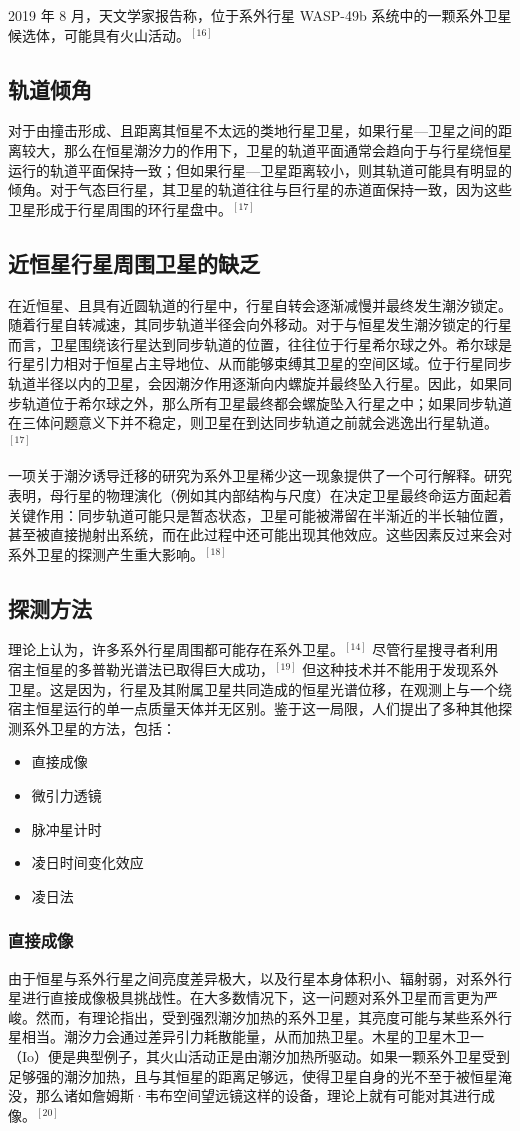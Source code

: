 2019 年 8 月，天文学家报告称，位于系外行星 WASP-49b 系统中的一颗系外卫星候选体，可能具有火山活动。$^{[16]}$
\subsection{轨道倾角}
对于由撞击形成、且距离其恒星不太远的类地行星卫星，如果行星—卫星之间的距离较大，那么在恒星潮汐力的作用下，卫星的轨道平面通常会趋向于与行星绕恒星运行的轨道平面保持一致；但如果行星—卫星距离较小，则其轨道可能具有明显的倾角。对于气态巨行星，其卫星的轨道往往与巨行星的赤道面保持一致，因为这些卫星形成于行星周围的环行星盘中。$^{[17]}$
\subsection{近恒星行星周围卫星的缺乏}
在近恒星、且具有近圆轨道的行星中，行星自转会逐渐减慢并最终发生潮汐锁定。随着行星自转减速，其同步轨道半径会向外移动。对于与恒星发生潮汐锁定的行星而言，卫星围绕该行星达到同步轨道的位置，往往位于行星希尔球之外。希尔球是行星引力相对于恒星占主导地位、从而能够束缚其卫星的空间区域。位于行星同步轨道半径以内的卫星，会因潮汐作用逐渐向内螺旋并最终坠入行星。因此，如果同步轨道位于希尔球之外，那么所有卫星最终都会螺旋坠入行星之中；如果同步轨道在三体问题意义下并不稳定，则卫星在到达同步轨道之前就会逃逸出行星轨道。$^{[17]}$

一项关于潮汐诱导迁移的研究为系外卫星稀少这一现象提供了一个可行解释。研究表明，母行星的物理演化（例如其内部结构与尺度）在决定卫星最终命运方面起着关键作用：同步轨道可能只是暂态状态，卫星可能被滞留在半渐近的半长轴位置，甚至被直接抛射出系统，而在此过程中还可能出现其他效应。这些因素反过来会对系外卫星的探测产生重大影响。$^{[18]}$
\subsection{探测方法}
理论上认为，许多系外行星周围都可能存在系外卫星。$^{[14]}$ 尽管行星搜寻者利用宿主恒星的多普勒光谱法已取得巨大成功，$^{[19]}$ 但这种技术并不能用于发现系外卫星。这是因为，行星及其附属卫星共同造成的恒星光谱位移，在观测上与一个绕宿主恒星运行的单一点质量天体并无区别。鉴于这一局限，人们提出了多种其他探测系外卫星的方法，包括：
\begin{itemize}
\item 直接成像
\item 微引力透镜
\item 脉冲星计时
\item 凌日时间变化效应
\item 凌日法
\end{itemize}
\subsubsection{直接成像}
由于恒星与系外行星之间亮度差异极大，以及行星本身体积小、辐射弱，对系外行星进行直接成像极具挑战性。在大多数情况下，这一问题对系外卫星而言更为严峻。然而，有理论指出，受到强烈潮汐加热的系外卫星，其亮度可能与某些系外行星相当。潮汐力会通过差异引力耗散能量，从而加热卫星。木星的卫星木卫一（Io）便是典型例子，其火山活动正是由潮汐加热所驱动。如果一颗系外卫星受到足够强的潮汐加热，且与其恒星的距离足够远，使得卫星自身的光不至于被恒星淹没，那么诸如詹姆斯·韦布空间望远镜这样的设备，理论上就有可能对其进行成像。$^{[20]}$
